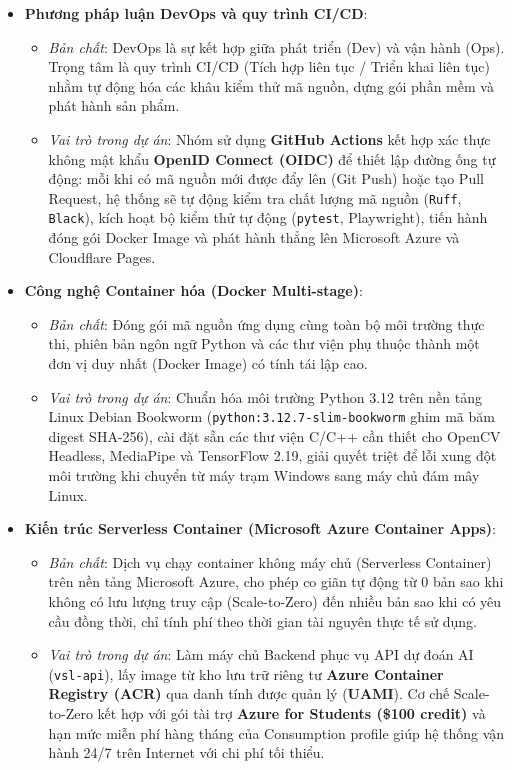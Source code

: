 \begin{itemize}
    \item \textbf{Phương pháp luận DevOps và quy trình CI/CD}:
    \begin{itemize}
        \item \textit{Bản chất}: DevOps là sự kết hợp giữa phát triển (Dev) và vận hành (Ops). Trọng tâm là quy trình CI/CD (Tích hợp liên tục / Triển khai liên tục) nhằm tự động hóa các khâu kiểm thử mã nguồn, dựng gói phần mềm và phát hành sản phẩm.
        \item \textit{Vai trò trong dự án}: Nhóm sử dụng \textbf{GitHub Actions} kết hợp xác thực không mật khẩu \textbf{OpenID Connect (OIDC)} để thiết lập đường ống tự động: mỗi khi có mã nguồn mới được đẩy lên (Git Push) hoặc tạo Pull Request, hệ thống sẽ tự động kiểm tra chất lượng mã nguồn (\texttt{Ruff}, \texttt{Black}), kích hoạt bộ kiểm thử tự động (\texttt{pytest}, Playwright), tiến hành đóng gói Docker Image và phát hành thẳng lên Microsoft Azure và Cloudflare Pages.
    \end{itemize}

    \item \textbf{Công nghệ Container hóa (Docker Multi-stage)}:
    \begin{itemize}
        \item \textit{Bản chất}: Đóng gói mã nguồn ứng dụng cùng toàn bộ môi trường thực thi, phiên bản ngôn ngữ Python và các thư viện phụ thuộc thành một đơn vị duy nhất (Docker Image) có tính tái lập cao.
        \item \textit{Vai trò trong dự án}: Chuẩn hóa môi trường Python 3.12 trên nền tảng Linux Debian Bookworm (\texttt{python:3.12.7-slim-bookworm} ghim mã băm digest SHA-256), cài đặt sẵn các thư viện C/C++ cần thiết cho OpenCV Headless, MediaPipe và TensorFlow 2.19, giải quyết triệt để lỗi xung đột môi trường khi chuyển từ máy trạm Windows sang máy chủ đám mây Linux.
    \end{itemize}

    \item \textbf{Kiến trúc Serverless Container (Microsoft Azure Container Apps)}:
    \begin{itemize}
        \item \textit{Bản chất}: Dịch vụ chạy container không máy chủ (Serverless Container) trên nền tảng Microsoft Azure, cho phép co giãn tự động từ 0 bản sao khi không có lưu lượng truy cập (Scale-to-Zero) đến nhiều bản sao khi có yêu cầu đồng thời, chỉ tính phí theo thời gian tài nguyên thực tế sử dụng.
        \item \textit{Vai trò trong dự án}: Làm máy chủ Backend phục vụ API dự đoán AI (\texttt{vsl-api}), lấy image từ kho lưu trữ riêng tư \textbf{Azure Container Registry (ACR)} qua danh tính được quản lý (\textbf{UAMI}). Cơ chế Scale-to-Zero kết hợp với gói tài trợ \textbf{Azure for Students (\$100 credit)} và hạn mức miễn phí hàng tháng của Consumption profile giúp hệ thống vận hành 24/7 trên Internet với chi phí tối thiểu.
    \end{itemize}


\end{itemize}
